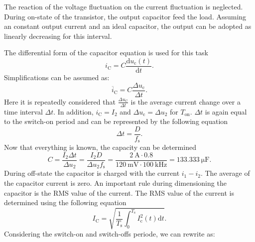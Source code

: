 \begin{solutionblock}
    The reaction of the voltage fluctuation on the current fluctuation is neglected. During on-state of the transistor, the output capacitor feed the load. Assuming an constant output current and an ideal capacitor, the output can be adopted as linearly decreasing for this interval.

    The differential form of the capacitor equation is used for this task
    \begin{equation}
        i_\mathrm{C}=C \frac{\mathrm{d}u_\mathrm{c}(t)}{\mathrm{d}t}.
    \end{equation}
    Simplifications can be assumed as:
    \begin{equation}
       \overline i_\mathrm{C}=C \frac{\Delta u_\mathrm{c}}{\Delta t}.
    \end{equation}
    Here it is repeatedly considered that $\frac{\Delta u_\mathrm{C}}{\Delta t}$ is the average current change over a time interval $\Delta t$.
    In addition, $i_\mathrm{C}=I_\mathrm{2}$ and $\Delta u_\mathrm{c}=\Delta u_\mathrm{2}$ for $T_\mathrm{on}$.
    $\Delta t$ is again equal to the switch-on period and can be represented by the following equation
    \begin{equation}
        \Delta t = \frac{D}{f_\mathrm{s}}. 
    \end{equation}
    Now that everything is known, the capacity can be determined
    \begin{equation}
        C = \frac{I_\mathrm{2}\Delta t}{\Delta u_\mathrm{2}}= \frac{I_\mathrm{2}D}{\Delta u_\mathrm{2}f_\mathrm{s}}=\frac{\SI{2}{\ampere}\cdot 0.8}{\SI{120}{\milli\volt} \cdot \SI{100}{\kilo\hertz}}=\SI{133.333}{\micro\farad}.
    \end{equation}
      During off-state the capacitor is charged with the current $i_\mathrm{1}-i_\mathrm{2}$. The average of the capacitor current is zero. An important rule during dimensioning the capacitor is the RMS value of the current. The RMS value of the current is determined using the following equation
     \begin{equation}
        I_\mathrm{C}=\sqrt{\frac{1}{T_\mathrm{s}}\int_{0}^{T_\mathrm{s}}I_\mathrm{c}^2(t)\mathrm{d}t}.
     \end{equation}
     Considering the switch-on and switch-offs periode, we can rewrite as:
     \begin{equation}

\end{equation}
\end{solutionblock}
